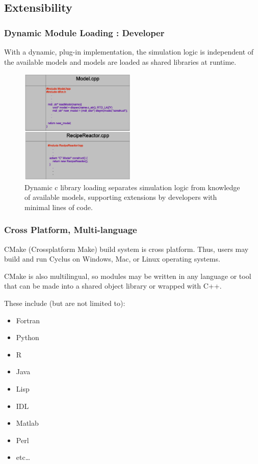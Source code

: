 \documentclass[9pt]{beamer}
\begin{document}
\subsection{Extensibility}
\begin{frame}
  \frametitle{Dynamic Module Loading : Developer}
  With a dynamic, plug-in implementation, the simulation logic is 
  independent of the available models and models are loaded as shared 
  libraries at runtime. 

  \begin{figure}[htbp!]
    \begin{center}
      \includegraphics[height=5.5cm]{developer.eps}
    \end{center}
    \caption{Dynamic c library loading separates simulation logic from 
    knowledge of available models, supporting extensions by developers 
    with minimal lines of code.}
    \label{fig:xmlinput}
  \end{figure}

\end{frame}
\begin{frame}[ctb!]
  \frametitle{Cross Platform, Multi-language}
  CMake (Crossplatform Make) build system is cross platform. Thus, 
  users may build and run Cyclus on Windows, Mac, or Linux 
  operating systems. 
  
  CMake is also multilingual, so modules may be written in any language 
  or tool that can be made into a shared object library or wrapped 
  with C++. 

  These include (but are not limited to): 
  \begin{itemize}
    \item Fortran
    \item Python
    \item R
    \item Java
    \item Lisp
    \item IDL
    \item Matlab
    \item Perl
    \item etc\ldots
  \end{itemize}
\end{frame}
\end{document}
